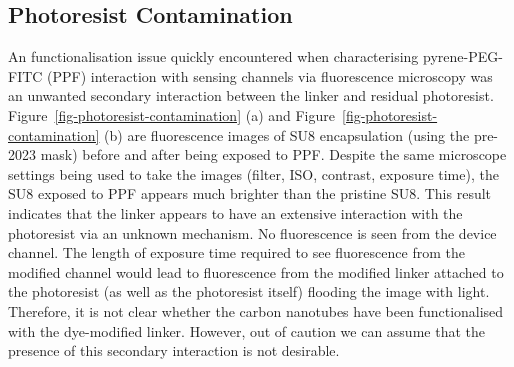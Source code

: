 \documentclass[
  a4paper,
]{scrbook}
\begin{document}
\hypertarget{sec-photoresist-contamination}{%
\subsection{Photoresist
Contamination}\label{sec-photoresist-contamination}}

An functionalisation issue quickly encountered when characterising
pyrene-PEG-FITC (PPF) interaction with sensing channels via fluorescence
microscopy was an unwanted secondary interaction between the linker and
residual photoresist. Figure~\ref{fig-photoresist-contamination} (a) and
Figure~\ref{fig-photoresist-contamination} (b) are fluorescence images
of SU8 encapsulation (using the pre-2023 mask) before and after being
exposed to PPF. Despite the same microscope settings being used to take
the images (filter, ISO, contrast, exposure time), the SU8 exposed to
PPF appears much brighter than the pristine SU8. This result indicates
that the linker appears to have an extensive interaction with the
photoresist via an unknown mechanism. No fluorescence is seen from the
device channel. The length of exposure time required to see fluorescence
from the modified channel would lead to fluorescence from the modified
linker attached to the photoresist (as well as the photoresist itself)
flooding the image with light. Therefore, it is not clear whether the
carbon nanotubes have been functionalised with the dye-modified linker.
However, out of caution we can assume that the presence of this
secondary interaction is not desirable.
\end{document}
